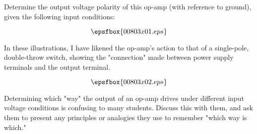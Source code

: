 

Determine the output voltage polarity of this op-amp (with reference to ground), given the following input conditions:

$$\epsfbox{00803x01.eps}$$







In these illustrations, I have likened the op-amp's action to that of a single-pole, double-throw switch, showing the "connection" made between power supply terminals and the output terminal.

$$\epsfbox{00803x02.eps}$$







Determining which "way" the output of an op-amp drives under different input voltage conditions is confusing to many students.  Discuss this with them, and ask them to present any principles or analogies they use to remember "which way is which."




